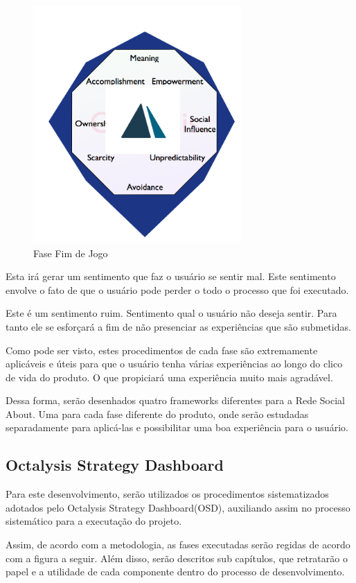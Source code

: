 \begin{figure}[h]
    \centering
    \includegraphics[width=300px, scale=1]{figuras/fasefimdejogo}
    \caption{Fase Fim de Jogo}
    \label{fig:fasefimdejogo}
\end{figure}

Esta irá gerar um sentimento que faz o usuário se sentir mal. Este sentimento
envolve o fato de que o usuário pode perder o todo o processo que foi executado.


Este é um sentimento ruim. Sentimento qual o usuário não deseja sentir. Para tanto
ele se esforçará a fim de não presenciar as experiências que são submetidas.

Como pode ser visto, estes procedimentos de cada fase são extremamente aplicáveis
e úteis para que o usuário tenha várias experiências ao longo do clico de vida do
produto. O que propiciará uma experiência muito mais agradável.

Dessa forma, serão desenhados quatro frameworks diferentes para a Rede Social About.
Uma para cada fase diferente do produto, onde serão estudadas separadamente para
aplicá-las e possibilitar uma boa experiência para o usuário.

\subsection{Octalysis Strategy Dashboard}
\label{sec:octalysisdashborad}
Para este desenvolvimento, serão utilizados os procedimentos sistematizados adotados
pelo Octalysis Strategy Dashboard(OSD), auxiliando assim no processo sistemático para
a executação do projeto. 

Assim, de acordo com a metodologia, as fases executadas serão regidas de acordo com a
figura a seguir.  Além disso, serão descritos sub capítulos, que retratarão o papel e a 
utilidade de cada componente dentro do processo de desenvolvimento.


